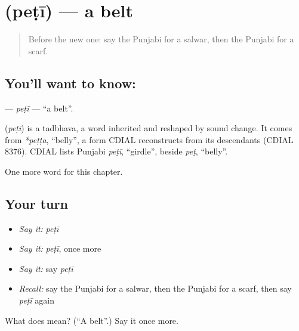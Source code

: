 \section[\texorpdfstring{\pa{ਪੇਟੀ} (peṭī)}{ਪੇਟੀ (peṭī)}]{ (peṭī) — a belt}

\label{lesson:PA-C119-peti}



\begin{quote}
Before the new one: say the Punjabi for a salwar, then the Punjabi for a scarf.
\end{quote}

\subsection*{You'll want to know: }
\textbf{} — \emph{peṭī} — \textquotedblleft{}a belt\textquotedblright{}.

\begin{cousinweb}
\textbf{} (\emph{peṭī}) is a tadbhava, a word inherited and reshaped by sound change. It comes from \emph{*peṭṭa}, \textquotedblleft{}belly\textquotedblright{}, a form CDIAL reconstructs from its descendants (CDIAL 8376). CDIAL lists Punjabi \emph{peṭī}, \textquotedblleft{}girdle\textquotedblright{}, beside \emph{peṭ}, \textquotedblleft{}belly\textquotedblright{}.
\end{cousinweb}

\begin{grammarlens}[title={What you've built}]
One more word for this chapter.
\end{grammarlens}

\subsection*{Your turn}
\begin{itemize}
\raggedright
  \item \emph{Say it:} \emph{peṭī}
  \item \emph{Say it:} \emph{peṭī}, once more
  \item \emph{Say it:} say \emph{peṭī}
  \item \emph{Recall:} say the Punjabi for a salwar, then the Punjabi for a scarf, then say \emph{peṭī} again
\end{itemize}

\begin{tcolorbox}[breakable,colback=teal!4,colframe=teal!35!black,title={Before you move on}]
What does  mean? (\textquotedblleft{}A belt\textquotedblright{}.) Say it once more.
\end{tcolorbox}
